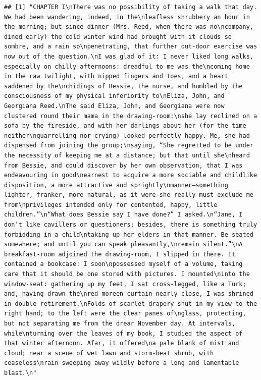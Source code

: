 \documentclass[
]{book}
\begin{document}
\begin{verbatim}
## [1] "CHAPTER I\nThere was no possibility of taking a walk that day. We had been wandering, indeed, in the\nleafless shrubbery an hour in the morning; but since dinner (Mrs. Reed, when there was no\ncompany, dined early) the cold winter wind had brought with it clouds so sombre, and a rain so\npenetrating, that further out-door exercise was now out of the question.\nI was glad of it: I never liked long walks, especially on chilly afternoons: dreadful to me was the\ncoming home in the raw twilight, with nipped fingers and toes, and a heart saddened by the\nchidings of Bessie, the nurse, and humbled by the consciousness of my physical inferiority to\nEliza, John, and Georgiana Reed.\nThe said Eliza, John, and Georgiana were now clustered round their mama in the drawing-room:\nshe lay reclined on a sofa by the fireside, and with her darlings about her (for the time neither\nquarrelling nor crying) looked perfectly happy. Me, she had dispensed from joining the group;\nsaying, “She regretted to be under the necessity of keeping me at a distance; but that until she\nheard from Bessie, and could discover by her own observation, that I was endeavouring in good\nearnest to acquire a more sociable and childlike disposition, a more attractive and sprightly\nmanner—something lighter, franker, more natural, as it were—she really must exclude me from\nprivileges intended only for contented, happy, little children.”\n“What does Bessie say I have done?” I asked.\n“Jane, I don’t like cavillers or questioners; besides, there is something truly forbidding in a child\ntaking up her elders in that manner. Be seated somewhere; and until you can speak pleasantly,\nremain silent.”\nA breakfast-room adjoined the drawing-room, I slipped in there. It contained a bookcase: I soon\npossessed myself of a volume, taking care that it should be one stored with pictures. I mounted\ninto the window-seat: gathering up my feet, I sat cross-legged, like a Turk; and, having drawn the\nred moreen curtain nearly close, I was shrined in double retirement.\nFolds of scarlet drapery shut in my view to the right hand; to the left were the clear panes of\nglass, protecting, but not separating me from the drear November day. At intervals, while\nturning over the leaves of my book, I studied the aspect of that winter afternoon. Afar, it offered\na pale blank of mist and cloud; near a scene of wet lawn and storm-beat shrub, with ceaseless\nrain sweeping away wildly before a long and lamentable blast.\n"
\end{verbatim}
\end{document}
